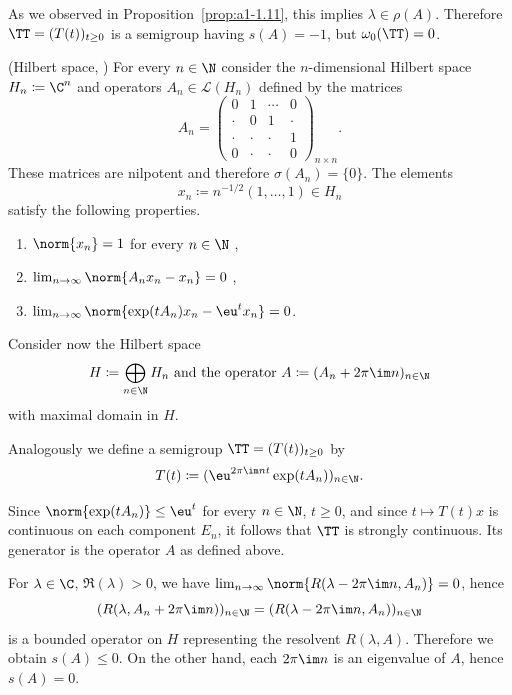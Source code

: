 As we observed in Proposition~\ref{prop:a1-1.11}, this implies $\lambda \in \rho(A)$.
Therefore $\TT = (T(t))_{t\geq 0}$ is a semigroup having $s(A) = -1$, but $\omega_{0}(\TT) = 0$.
\begin{example}\label{ex:a3-1.4}(Hilbert space, \textcite{zabczyk:1975})
For every $n \in \N$ consider the $n$-dimensional Hilbert space $H_{n} \coloneqq \C^{n}$ and operators $A_{n} \in \mathcal{L}(H_{n})$ defined by the matrices
\[
    A_{n} =
    \begin{pmatrix}
    0 & 1 & \cdots & 0 \\
    \cdot & 0 & 1 & \cdot \\
    \cdot & \cdot & \cdot & 1 \\
    0 & \cdot & \cdot & 0
    \end{pmatrix}_{n \times n} .
\]
These matrices are nilpotent and therefore $\sigma(A_{n}) = \{0\}$.
The elements 
\[
	x_{n} \coloneqq n^{-1/2}(1, \ldots, 1) \in H_{n}
\]
satisfy the following properties.
\begin{enumerate}[\upshape (i)]
\item
	$\norm{x_{n}} = 1$ for every $n \in \N$ , 

\item
	$\lim_{n \to \infty} \norm{A_{n}x_{n} - x_{n}} = 0$ , 

\item
	$\lim_{n \to \infty} \norm{\exp(tA_{n})x_{n} - \eu^{t}x_{n}} = 0$. 

\end{enumerate}
Consider now the Hilbert space 
%
\[
	\text{$H \coloneqq \bigoplus_{n \in \N} H_{n}$ and the operator 
		$A \coloneqq (A_{n} + 2\pi\im n)_{n \in \N}$}
\]
%
with maximal domain in $H$.

Analogously we define a semigroup $\TT = (T(t))_{t \geq 0}$ by
\[
    T(t) \coloneqq (\eu^{2\pi\im nt}\exp(tA_{n}))_{n \in \N} .
\]
\end{example}
Since $\norm{\exp(tA_{n})} \leq \eu^{t}$ for every $n \in \N$, $t \geq 0$, and since $t \mapsto T(t)x$ is continuous on each component $E_{n}$, it follows that $\TT$ is strongly continuous.
Its generator is the operator $A$ as defined above.

For $\lambda \in \C$, $\Re(\lambda) > 0$, we have 
$\lim_{n \to \infty} \norm{R(\lambda-2\pi\im n,A_{n})} = 0$, hence
\[
    (R(\lambda,A_{n}+2\pi\im n))_{n \in \N} = (R(\lambda-2\pi\im n,A_{n}))_{n \in \N}
\]
is a bounded operator on $H$ representing the resolvent $R(\lambda,A)$.
Therefore we obtain $s(A) \leq 0$.
On the other hand, each $2\pi\im n$ is an eigenvalue of\/ $A$, hence $s(A) = 0$.

